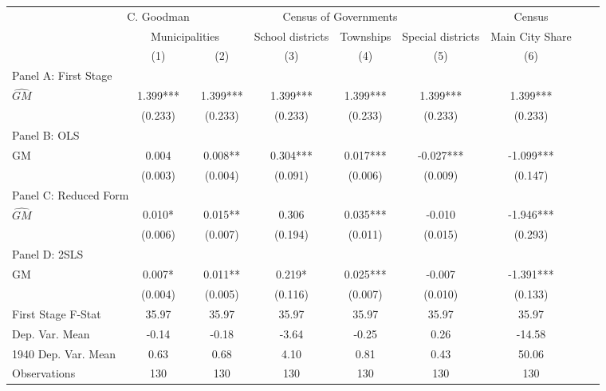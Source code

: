  \begin{tabular}{l*{8}{c}} \toprule
&\multicolumn{1}{c}{C. Goodman}&\multicolumn{4}{c}{Census of Governments}&\multicolumn{1}{c}{Census}\\\cmidrule(lr){2-2}\cmidrule(lr){3-6}\cmidrule(lr){7-7}
&\multicolumn{2}{c}{Municipalities}&\multicolumn{1}{c}{School districts}&\multicolumn{1}{c}{Townships}&\multicolumn{1}{c}{Special districts}&\multicolumn{1}{c}{Main City Share}\\\cmidrule(lr){2-3}\cmidrule(lr){4-6}\cmidrule(lr){7-7}
&\multicolumn{1}{c}{(1)}&\multicolumn{1}{c}{(2)}&\multicolumn{1}{c}{(3)}&\multicolumn{1}{c}{(4)}&\multicolumn{1}{c}{(5)}&\multicolumn{1}{c}{(6)}\\
\cmidrule(lr){1-7}
\multicolumn{6}{l}{Panel A: First Stage}\\
\cmidrule(lr){1-7}
$\widehat{GM}$  &    1.399***&    1.399***&    1.399***&    1.399***&    1.399***&    1.399***\\
                &  (0.233)   &  (0.233)   &  (0.233)   &  (0.233)   &  (0.233)   &  (0.233)   \\
\cmidrule(lr){1-7}
\multicolumn{6}{l}{Panel B: OLS}\\
\cmidrule(lr){1-7}
GM              &    0.004   &    0.008** &    0.304***&    0.017***&   -0.027***&   -1.099***\\
                &  (0.003)   &  (0.004)   &  (0.091)   &  (0.006)   &  (0.009)   &  (0.147)   \\
\cmidrule(lr){1-7}
\multicolumn{6}{l}{Panel C: Reduced Form}\\
\cmidrule(lr){1-7}
$\widehat{GM}$  &    0.010*  &    0.015** &    0.306   &    0.035***&   -0.010   &   -1.946***\\
                &  (0.006)   &  (0.007)   &  (0.194)   &  (0.011)   &  (0.015)   &  (0.293)   \\
\cmidrule(lr){1-7}
\multicolumn{6}{l}{Panel D: 2SLS}\\
\cmidrule(lr){1-7}
GM              &    0.007*  &    0.011** &    0.219*  &    0.025***&   -0.007   &   -1.391***\\
                &  (0.004)   &  (0.005)   &  (0.116)   &  (0.007)   &  (0.010)   &  (0.133)   \\
\midrule
First Stage F-Stat&    35.97   &    35.97   &    35.97   &    35.97   &    35.97   &    35.97   \\
Dep. Var. Mean  &    -0.14   &    -0.18   &    -3.64   &    -0.25   &     0.26   &   -14.58   \\
1940 Dep. Var. Mean&     0.63   &     0.68   &     4.10   &     0.81   &     0.43   &    50.06   \\
Observations    &      130   &      130   &      130   &      130   &      130   &      130   \\
       \bottomrule \end{tabular}
